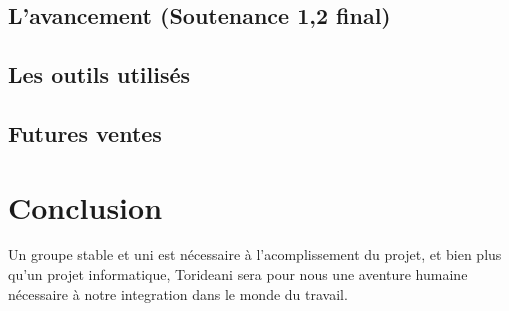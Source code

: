 \documentclass[12pt]{report}
\begin{document}
    \section{L'avancement (Soutenance 1,2 final)} 
    \section{Les outils utilisés}
    \section{Futures ventes}

\chapter{Conclusion}
Un groupe stable et uni est nécessaire à l'acomplissement du
projet, et bien plus qu'un projet informatique, Torideani sera pour
nous une aventure humaine nécessaire à notre integration dans le
monde du travail.
\end{document}
